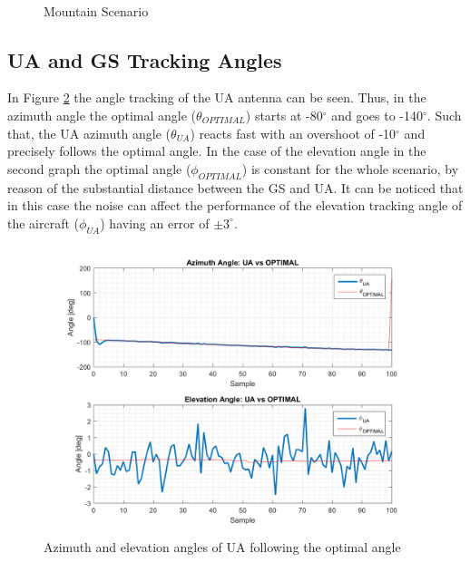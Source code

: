 \begin{figure}[H]
	\\
	\caption{Mountain Scenario}
	\label{fig:s4_map}
\end{figure}

\subsection*{UA and GS Tracking Angles}
In Figure \ref{fig:s4_ua} the angle tracking of the UA antenna can be seen. Thus, in the azimuth angle the optimal angle ($\theta_{OPTIMAL}$) starts at -80$^{\circ}$ and goes to -140$^{\circ}$. Such that, the UA azimuth angle ($\theta_{UA}$) reacts fast with an overshoot of -10$^{\circ}$ and precisely follows the optimal angle. In the case of the elevation angle in the second graph the optimal angle ($\phi_{OPTIMAL}$) is constant for the whole scenario, by reason of the substantial distance between the GS and UA. It can be noticed that in this case the noise can affect the performance of the elevation tracking angle of the aircraft ($\phi_{UA}$) having an error of $\pm3^{\circ}$. 

\begin{figure}[H]
	\centering
	\includegraphics[scale=0.75]{figures/s4_ua.png}
	\caption{Azimuth and elevation angles of UA following the optimal angle}
	\label{fig:s4_ua}
\end{figure}

